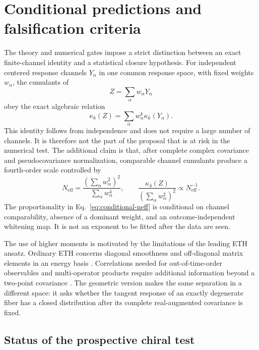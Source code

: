\section{Conditional predictions and falsification criteria}
\label{sec:predictions}

The theory and numerical gates impose a strict distinction between an exact
finite-channel identity and a statistical closure hypothesis.  For independent
centered response channels $Y_\alpha$ in one common response space, with fixed
weights $w_\alpha$, the cumulants of
\begin{equation}
 Z=\sum_{\alpha}w_\alpha Y_\alpha
 \label{eq:conditional-channel-sum}
\end{equation}
obey the exact algebraic relation
\begin{equation}
 \kappa_k(Z)=\sum_{\alpha}w_\alpha^k\kappa_k(Y_\alpha).
 \label{eq:conditional-cumulant-law}
\end{equation}
This identity follows from independence and does not require a large number
of channels.  It is therefore not the part of the proposal that is at risk in
the numerical test.  The additional claim is that, after complete complex
covariance and pseudocovariance normalization, comparable channel cumulants
produce a fourth-order scale controlled by
\begin{equation}
 N_{\mathrm{eff}}
 =\frac{\left(\sum_\alpha w_\alpha^2\right)^2}
 {\sum_\alpha w_\alpha^4},
 \qquad
 \frac{\kappa_4(Z)}{\left(\sum_\alpha w_\alpha^2\right)^2}
 \propto N_{\mathrm{eff}}^{-1}.
 \label{eq:conditional-neff}
\end{equation}
The proportionality in Eq.~\eqref{eq:conditional-neff} is conditional on
channel comparability, absence of a dominant weight, and an outcome-independent
whitening map.  It is not an exponent to be fitted after the data are seen.

The use of higher moments is motivated by the limitations of the leading ETH
ansatz.  Ordinary ETH concerns diagonal smoothness and off-diagonal matrix
elements in an energy basis \cite{deutsch1991,srednicki1994}.  Correlations
needed for out-of-time-order observables and multi-operator products require
additional information beyond a two-point covariance
\cite{foinikurchan2019,pappalardi2022}.  The geometric version makes the same
separation in a different space: it asks whether the tangent response of an
exactly degenerate fiber has a closed distribution after its complete
real-augmented covariance is fixed.

\subsection{Status of the prospective chiral test}

